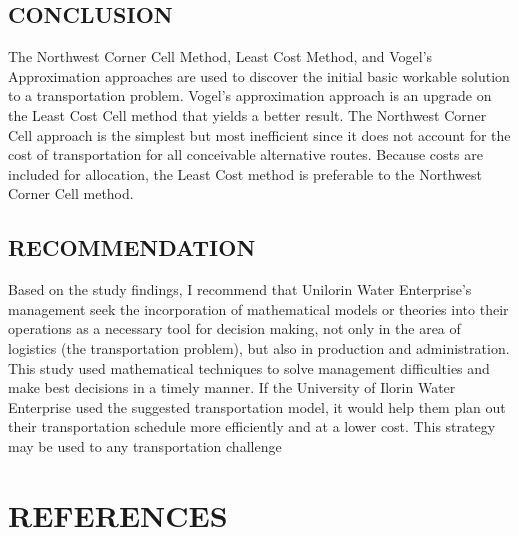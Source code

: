 \documentclass[12pt]{report}
\newcommand{\NI}{\noindent}
\begin{document}
	\section{CONCLUSION}
	The Northwest Corner Cell Method, Least Cost Method, and Vogel's Approximation approaches are used to discover the initial basic workable solution to a transportation problem. Vogel's approximation approach is an upgrade on the Least Cost Cell method that yields a better result. The Northwest Corner Cell approach is the simplest but most inefficient since it does not account for the cost of transportation for all conceivable alternative routes. Because costs are included for allocation, the Least Cost method is preferable to the Northwest Corner Cell method.

	\section{RECOMMENDATION}
	Based on the study findings, I recommend that Unilorin Water Enterprise's management seek the incorporation of mathematical models or theories into their operations as a necessary tool for decision making, not only in the area of logistics (the transportation problem), but also in production and administration.\\
	
	\NI This study used mathematical techniques to solve management difficulties and make best decisions in a timely manner. If the University of Ilorin Water Enterprise used the suggested transportation model, it would help them plan out their transportation schedule more efficiently and at a lower cost. This strategy may be used to any transportation challenge
	
	
	\chapter*{REFERENCES}
	
\end{document}
